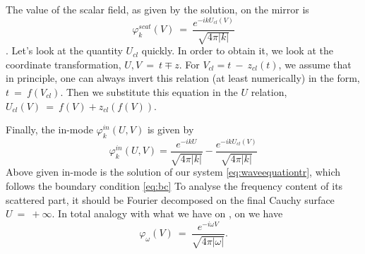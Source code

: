 The value of the scalar field, as given by the solution, on the mirror is 
 \begin{equation*}
     \varphi_k^{scat}(V)~=~\frac{e^{-i k U_{cl}(V)}}{\sqrt{4\pi|k|}}
 \end{equation*}.
 Let's look at the quantity $U_{cl}$ quickly. In order to obtain it, we look at the coordinate transformation, $U, V~=~t\mp z$. For $V_{cl}=t~-~z_{cl}(t)$, we assume that in principle, one can always invert this relation (at least numerically) in the form, $t~=~f(V_{cl})$. Then we substitute this equation in the $U$ relation, $U_{cl}(V)~=~f(V)+z_{cl}(f(V))$.

 
 Finally, the in-mode $\varphi_k^{in}(U,V)$ is given by 
 \begin{equation*}
     \varphi_k^{in}(U,V) = \frac{e^{-i k U}}{\sqrt{4\pi|k|}}-\frac{e^{-i k U_{cl}(V)}}{\sqrt{4\pi|k|}}
 \end{equation*}
Above given in-mode is the solution of our system \ref{eq:waveequationtr}, which follows the boundary condition \ref{eq:bc}
 To analyse the frequency content of its scattered part, it should be Fourier decomposed on the final Cauchy surface $U~=~+\infty$. In total analogy with what we have on \scrim, on \scrip we have 
 \begin{equation*}
     \varphi_\omega(V)~=~\frac{e^{-i \omega V}}{\sqrt{4\pi|\omega|}}.
 \end{equation*}

